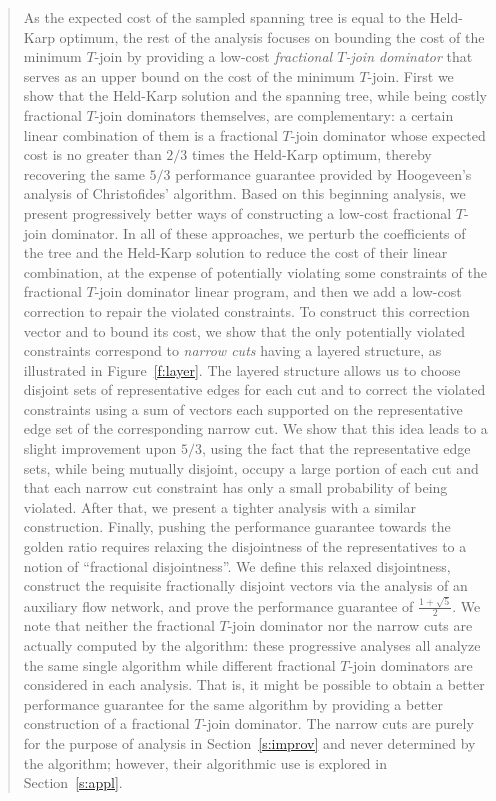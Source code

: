 \documentclass[11pt,letterpaper]{article}
\begin{document}
\begin{quote}
As the expected cost of the sampled spanning tree is equal to the Held-Karp optimum, the rest of the analysis focuses on bounding the cost of the minimum $T$-join by providing a low-cost \emph{fractional $T$-join dominator} that serves as an upper bound on the cost of the minimum $T$-join. First we show that the Held-Karp solution and the spanning tree, while being costly fractional $T$-join dominators themselves, are complementary: a certain linear combination of them is a fractional $T$-join dominator whose expected cost is no greater than $2/3$ times the Held-Karp optimum, thereby recovering the same $5/3$ performance guarantee provided by Hoogeveen's analysis of Christofides' algorithm. Based on this beginning analysis, we present progressively better ways of constructing a low-cost fractional $T$-join dominator. In all of these approaches, we perturb the coefficients of the tree and the Held-Karp solution to reduce the cost of their linear combination, at the expense of potentially violating some constraints of the fractional $T$-join dominator linear program, and then we add a low-cost correction to repair the violated constraints. To construct this correction vector and to bound its cost, we show that the only potentially violated constraints correspond to \emph{narrow cuts} having a layered structure, as illustrated in Figure~\ref{f:layer}. The layered structure allows us to choose disjoint sets of representative edges for each cut and to correct the violated constraints using a sum of vectors each supported on the representative edge set of the corresponding narrow cut. We show that this idea leads to a slight improvement upon $5/3$, using the fact that the representative edge sets, while being mutually disjoint, occupy a large portion of each cut and that each narrow cut constraint has only a small probability of being violated. After that, we present a tighter analysis with a similar construction. Finally, pushing the performance guarantee towards the golden ratio requires relaxing the disjointness of the representatives to a notion of ``fractional disjointness''. We define this relaxed disjointness, construct the requisite fractionally disjoint vectors via the analysis of an auxiliary flow network, and prove the performance guarantee of $\frac{1+\sqrt{5}}{2}$. We note that neither the fractional $T$-join dominator nor the narrow cuts are actually computed by the algorithm: these progressive analyses all analyze the same single algorithm while different fractional $T$-join dominators are considered in each analysis. That is, it might be possible to obtain a better performance guarantee for the same algorithm by providing a better construction of a fractional $T$-join dominator. The narrow cuts are purely for the purpose of analysis in Section~\ref{s:improv} and never determined by the algorithm; however, their algorithmic use is explored in Section~\ref{s:appl}.


\end{quote}
\end{document}
